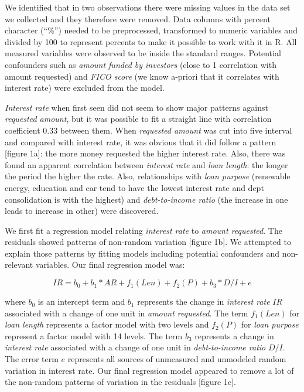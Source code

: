 \documentclass[a4paper,12pt]{extarticle}
\begin{document}
We identified that in two observations there were missing values in the data set we collected and they therefore were removed. Data columns with percent character (``\%'') needed to be preprocessed, transformed to numeric variables and divided by 100 to represent percents to make it possible to work with it in R. All measured variables were observed to be inside the standard ranges. Potential confounders such as \emph{amount funded by investors} (close to 1 correlation with amount requested) and \emph{FICO score} (we know a-priori that it correlates with interest rate) were excluded from the model.

\emph{Interest rate} when first seen did not seem to show major patterns against \emph{requested amount}, but it was possible to fit a straight line with correlation coefficient 0.33 between them. When \emph{requested amount} was cut into five interval and compared with interest rate, it was obvious that it did follow a pattern [figure 1a]: the more money requested the higher interest rate. Also, there was found an apparent correlation between \emph{interest rate} and \emph{loan length}: the longer the period the higher the rate. Also, relationships with \emph{loan purpose} (renewable energy, education and car tend to have the lowest interest rate and dept consolidation is with the highest) and \emph{debt-to-income ratio} (the increase in one leads to increase in other) were discovered.

We first fit a regression model relating \emph{interest rate} to \emph{amount requested}. The residuals showed patterns of non-random variation [figure 1b]. We attempted to explain those patterns by fitting models including potential confounders and non-relevant variables. Our final regression model was:

$$IR  = b_0 + b_1 * AR + f_1(Len) + f_2(P) + b_3 * D/I + e$$

where $b_0$ is an intercept term and $b_1$ represents the change in \emph{interest rate} $IR$ associated with a change of one unit in \emph{amount requested}. The term $f_1(Len)$ for \emph{loan length} represents a factor model with two levels and $f_2(P)$ for \emph{loan purpose} represent a factor model with 14 levels. The term $b_3$ represents a change in \emph{interest rate} associated with a change of one unit in \emph{debt-to-income ratio} $D/I$. The error term $e$ represents all sources of unmeasured and unmodeled random variation in interest rate. Our final regression model appeared to remove a lot of the non-random patterns of variation in the residuals [figure 1c].
\end{document}
